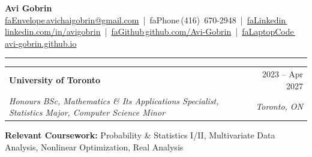 \documentclass[letterpaper,10pt]{article}
\makeatletter
\newcommand{\I}[1]{\csname fa#1\endcsname\,}%
\newcommand{\Section}[1]{\vspace{4pt}{\large\bfseries #1}\vspace{1pt}\hrule\vspace{3pt}}
\newcommand{\entry}[4]{%
  \vspace{2pt}%
  \begin{tabular*}{\textwidth}{@{}l@{\extracolsep{\fill}}r@{}}
    \textbf{#1} & #2 \\
    \textit{#3} & \textit{#4} \\
  \end{tabular*}\vspace{-4pt}}
\makeatother
\begin{document}
\begin{center}
  {\Huge\bfseries Avi Gobrin}\\[4pt]
  \small
  \mbox{\href{mailto:avichaigobrin@gmail.com}{\I{Envelope}avichaigobrin@gmail.com}} \,|\,
  \mbox{\I{Phone}(416)~670-2948} \,|\,
  \mbox{\href{https://www.linkedin.com/in/avigobrin/}{\I{Linkedin}linkedin.com/in/avigobrin}} \,|\,
  \mbox{\href{https://github.com/Avi-Gobrin}{\I{Github}github.com/Avi-Gobrin}} \,|\,
  \mbox{\href{https://avi-gobrin.github.io/personal-site/}{\I{LaptopCode}avi-gobrin.github.io}}
\end{center}

\Section{Education}
\entry{University of Toronto}{2023 -- Apr 2027}{Honours BSc, Mathematics \& Its Applications Specialist, Statistics Major, Computer Science Minor}{Toronto, ON}
\par\vspace{6pt}\noindent
\textbf{Relevant Coursework:} Probability \& Statistics I/II, Multivariate Data Analysis, Nonlinear Optimization, Real Analysis
\end{document}
